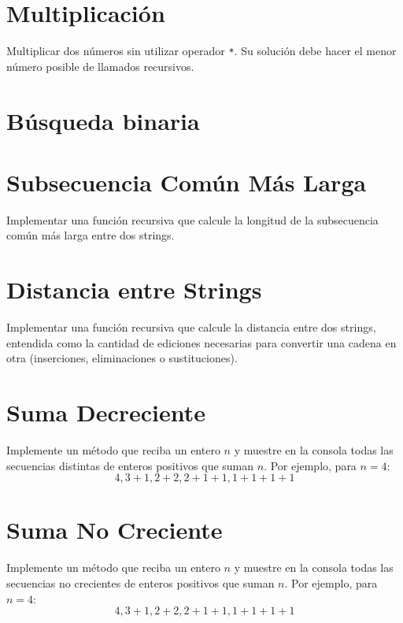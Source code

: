 \section{Multiplicación}
Multiplicar dos números sin utilizar operador \texttt{*}. Su solución debe hacer el menor número posible de llamados recursivos.



\section{Búsqueda binaria}


\section{Subsecuencia Común Más Larga}
Implementar una función recursiva que calcule la longitud de la subsecuencia común más larga entre dos strings.

\section{Distancia entre Strings}
Implementar una función recursiva que calcule la distancia entre dos strings, entendida como la cantidad de ediciones necesarias para convertir una cadena en otra (inserciones, eliminaciones o sustituciones).

\section{Suma Decreciente}
Implemente un método que reciba un entero \( n \) y muestre en la consola todas las secuencias distintas de enteros positivos que suman \( n \). Por ejemplo, para \( n = 4 \):
\[
4, 3+1, 2+2, 2+1+1, 1+1+1+1
\]

\section{Suma No Creciente}
Implemente un método que reciba un entero \( n \) y muestre en la consola todas las secuencias no crecientes de enteros positivos que suman \( n \). Por ejemplo, para \( n = 4 \):
\[
4, 3+1, 2+2, 2+1+1, 1+1+1+1
\]

